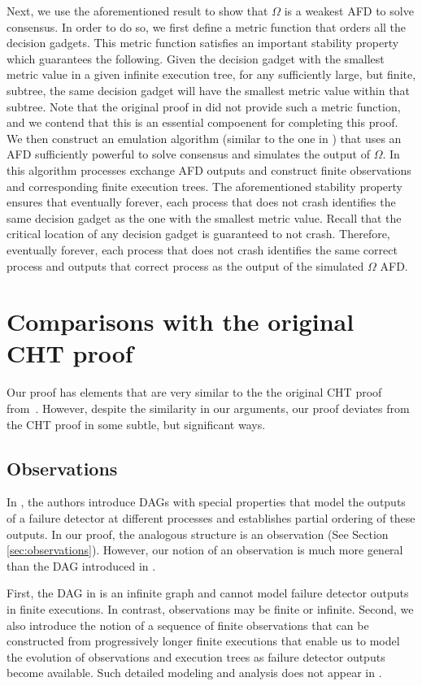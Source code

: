 \documentclass[11pt]{article}
\numberwithin{theorem}{section}
\begin{document}
Next, we use the aforementioned result to show that $\Omega$ is a weakest AFD to solve consensus. In order to do so, we first define a metric function that orders all the decision gadgets. This metric function satisfies an important stability property which guarantees the following. Given the decision gadget with the smallest metric value in a given infinite execution tree, for any sufficiently large, but finite, subtree, the same decision gadget will have the smallest metric value within that subtree. Note that the original proof in \cite{chan:twfdf} did not provide such a metric function, and we contend that this is an essential compoenent for completing this proof. We then construct an emulation algorithm (similar to the one in \cite{chan:twfdf}) that uses an AFD sufficiently powerful to solve consensus and simulates the output of $\Omega$. In this algorithm processes exchange AFD outputs and construct finite observations and corresponding finite execution trees. The aforementioned stability property ensures that eventually forever, each process that does not crash identifies the same decision gadget as the one with the smallest metric value. Recall that the critical location of any decision gadget is guaranteed to not crash. Therefore, eventually forever, each process that does not crash identifies the same correct process and outputs that correct process as the output of the simulated $\Omega$ AFD.


\section{Comparisons with the original CHT proof}\label{sec:comarisonWithCHT}
Our proof has elements that are very similar to the the original CHT proof from~\cite{chan:twfdf}. However, despite the similarity in our arguments, our proof deviates from the CHT proof in some subtle, but significant ways.

\subsection{Observations}
In \cite{chan:twfdf}, the authors introduce DAGs with special properties that model the outputs of a failure detector at different processes and establishes partial ordering of these outputs. In our proof, the analogous structure is an observation (See Section \ref{sec:observations}). However, our notion of an observation is much more general than the DAG introduced in \cite{chan:twfdf}.

First, the DAG in \cite{chan:twfdf} is an infinite graph and cannot model failure detector outputs in finite executions. In contrast, observations may be finite or infinite. Second, we also introduce the notion of a sequence of finite observations that can be constructed from progressively longer finite executions that enable us to model the evolution of observations and execution trees as failure detector outputs become available. Such detailed modeling and analysis does not appear in \cite{chan:twfdf}.
\end{document}
